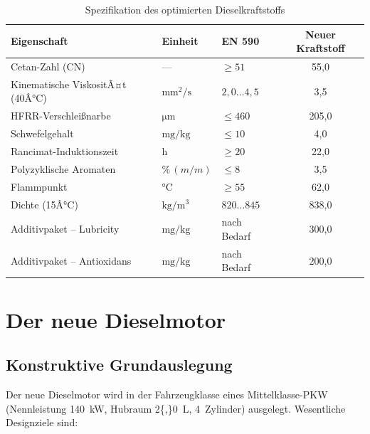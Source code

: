 ﻿\documentclass[12pt,a4paper]{article}
\begin{document}
\begin{table}[H]
  \centering
  \caption{Spezifikation des optimierten Dieselkraftstoffs}
  \label{tab:kraftstoff_spec}
  \begin{tabular}{lllS[table-format=3.1]}
    \toprule
    Eigenschaft & Einheit & EN 590 & {Neuer Kraftstoff} \\
    \midrule
    Cetan-Zahl (CN) & --- & $\geq 51$ & 55{,}0 \\
    Kinematische ViskositÃ¤t (40Â°C) & $\si{\mm\squared\per\s}$ & $2{,}0\ldots 4{,}5$ & 3{,}5 \\
    HFRR-Verschlei\ss{}narbe & $\si{\micro\m}$ & $\leq 460$ & 205{,}0 \\
    Schwefelgehalt & $\si{\mg\per\kg}$ & $\leq 10$ & 4{,}0 \\
    Rancimat-Induktionszeit & $\si{\hour}$ & $\geq 20$ & 22{,}0 \\
    Polyzyklische Aromaten & $\si{\percent\,(m/m)}$ & $\leq 8$ & 3{,}5 \\
    Flammpunkt & $\si{\celsius}$ & $\geq 55$ & 62{,}0 \\
    Dichte (15Â°C) & $\si{\kg\per\m\cubed}$ & $820\ldots 845$ & 838{,}0 \\
    Additivpaket -- Lubricity & $\si{\mg\per\kg}$ & nach Bedarf & 300{,}0 \\
    Additivpaket -- Antioxidans & $\si{\mg\per\kg}$ & nach Bedarf & 200{,}0 \\
    \bottomrule
  \end{tabular}
\end{table}

\section{Der neue Dieselmotor}
\label{sec:motor}

\subsection{Konstruktive Grundauslegung}
\label{sec:motor_auslegung}

Der neue Dieselmotor wird in der Fahrzeugklasse eines Mittelklasse-PKW
(Nennleistung \SI{140}{\kW}, Hubraum \SI{2{,}0}{\liter}, 4~Zylinder)
ausgelegt. Wesentliche Designziele sind:
\end{document}
